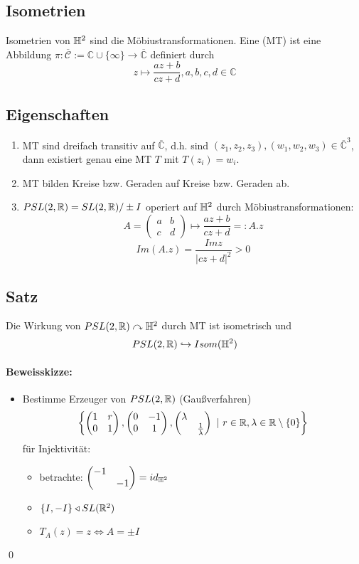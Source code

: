 \documentclass{article}
\renewcommand{\C}{\mathcal{C}}
\newcommand{\Cz}{\mathbb{C}}
\begin{document}
\subsection{Isometrien}
Isometrien von $\mathbb{H}^2$ sind die Möbiustransformationen. Eine  (MT) ist eine Abbildung $\pi : \overline{\C} := \Cz\cup\{\infty\} \rightarrow \overline{\Cz}$ definiert durch
\[z \longmapsto \frac{az + b}{cz + d}, a,b,c,d \in \Cz \]

\subsection{Eigenschaften}
\begin{enumerate}
	\item MT sind dreifach transitiv auf $\overline{\Cz}$, d.h. sind $(z_1, z_2, z_3),(w_1, w_2, w_3) \in \overline{\Cz}^3$, dann existiert genau eine MT $T$ mit $T(z_i) = w_i$.
	\item MT bilden Kreise bzw. Geraden auf Kreise bzw. Geraden ab.
	\item $PSL(2,\mathbb{R}) = SL(2,\mathbb{R})/\pm I $ operiert auf $\mathbb{H}^2$ durch Möbiustransformationen:
	\[A = \left(\begin{matrix}
	a & b \\
	c & d
	\end{matrix}\right) \longmapsto \frac{az + b }{cz + d}=: A.z\]
	\[Im(A.z) = \frac{Im z}{\left|cz + d\right|^2} > 0 \]
\end{enumerate}

\subsection{Satz}
Die Wirkung von $PSL(2,\mathbb{R}) \curvearrowright \mathbb{H}^2$ durch MT ist isometrisch und 
\[PSL(2,\mathbb{R}) \hookrightarrow Isom(\mathbb{H}^2) \]

\paragraph{Beweisskizze:}
\begin{itemize}
	\item Bestimme Erzeuger von $PSL(2, \mathbb{R})$ (Gaußverfahren)
	\[\set{\Matrix{1}{r}{0}{1}, \Matrix{0}{-1}{0}{1}, \Matrix{\lambda}{}{}{\frac{1}{\lambda}}}{r \in \R, \lambda \in \R \setminus \{0\}}\]
	für Injektivität:\\
	\begin{itemize}
		\item betrachte: $\left(\begin{matrix} -1 & \\  & -1 \end{matrix}\right) = id_{\mathbb{H}^2}$
		\item $\{I, -I\} \triangleleft SL(\mathbb{R}^2)$
		\item $T_A(z) = z \Longleftrightarrow A = \pm I$
	\end{itemize}	
\end{itemize}
\qed
\end{document}
